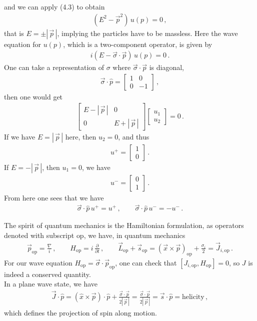 \documentclass[11pt, onesided]{book}
\theoremstyle{break}
\theoremstyle{break}
\newcommand{\pd}{\partial}
\newcommand{\bmat}[1]{\begin{bmatrix} #1 \end{bmatrix}}
\begin{document}
and we can apply (4.3) to obtain
\begin{align*}
(E^2 - \vec{p}^2) \, u(p) = 0\,,
\end{align*}
that is $E = \pm |\,\vec{p}\,|$, implying the particles have to be massless. Here the wave equation for $u(p)$, which is a two-component operator, is given by
\begin{align*}
i(E - \vec{\sigma} \cdot \vec{p})\, u(p) = 0\,.
\end{align*}
One can take a representation of $\sigma$ where $\vec{\sigma}\cdot \vec{p}$ is diagonal, 
\begin{align*}
\vec{\sigma}\cdot \hat{p} = \bmat{1 & 0 \\ 0 & -1}\,,
\end{align*}
then one would get
\begin{align*}
\bmat{E - |\, \vec{p}\,| & 0 \\
0 & E + |\,\vec{p}\,|} \bmat{u_1\\ u_2} = 0\,.
\end{align*}
If we have $E = |\,\vec{p}\,|$ here, then $u_2 = 0$, and thus
\begin{align*}
u^+ = \bmat{1 \\ 0}\,.
\end{align*}
If $E = -|\,\vec{p}\,|$, then $u_1 = 0$, we have
\begin{align*}
u^- = \bmat{0 \\ 1}\,.
\end{align*}
From here one sees that we have
\begin{align*}
\vec{\sigma} \cdot \hat{p} \, u^+ = u^+\,,\qquad
\vec{\sigma} \cdot \hat{p} \, u^- = -u^-\,.
\end{align*} 

The spirit of quantum mechanics is the Hamiltonian formulation, as operators denoted with subscript $\text{op}$, we have, in quantum mechanics 
\begin{align*}
\vec{p}_{\text{op}} = \frac{\nabla}{i}\,,\qquad H_{\text{op}} = i \,\frac{\pd}{\pd t}\,,\qquad
\vec{L}_{\text{op}} + \vec{s}_{\text{op}} = (\vec{x} \times \vec{p})_{\text{op}} + \frac{\sigma_i}{2} = \vec{J}_{i,\text{op}}\,.
\end{align*}
For our wave equation $H_{\text{op}} = \vec{\sigma}\cdot \vec{p}_{\text{op}}$, one can check that $[J_{i, \text{op}},H_{\text{op}}] = 0$, so $J$ is indeed a conserved quantity.\\


In a plane wave state, we have
\begin{align*}
\vec{J}\cdot \hat{p} = (\hat{x}\times \vec{p})\cdot \hat{p} + \frac{\vec{\sigma}\cdot \vec{p}}{2|\,\vec{p}\,|}=\frac{\vec{\sigma}\cdot \vec{p}}{2|\,\vec{p}\,|} = \vec{s}\cdot \hat{p} = \text{helicity}\,,
\end{align*}
which defines the projection of spin along motion. \\
\end{document}
